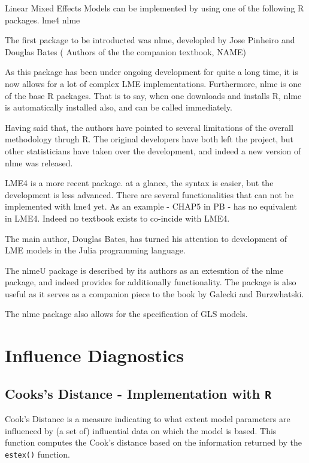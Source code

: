 	Linear Mixed Effects Models can be implemented by using one of the following R packages.
	lme4
	nlme
	
	The first package to be introducted was nlme, developled by Jose Pinheiro and Douglas Bates ( Authors of the the companion textbook, NAME)
	
	As this package has been under ongoing development for quite a long time, it is now allows for a lot of complex LME implementations. 
	Furthermore, nlme is one of the base R packages.  That is to say, when one downloads and installs R, nlme is automatically installed also, and can be called immediately.
	
	Having said that, the authors have pointed to several limitations of the overall methodology thrugh R.
	The original developers have both left the project, but other statisticians have taken over the development, and indeed a new version of nlme was released.
	
	LME4 is a more recent package. at a glance, the syntax is easier, but the development is less advanced. There are several functionalities that can not be implemented with lme4 yet. 
	As an example - CHAP5 in PB - has no equivalent in LME4. Indeed no textbook exists to co-incide with LME4.
	
	The main author, Douglas Bates, has turned his attention to development of LME models in the Julia programming language.
	
	The nlmeU package is described by its authors as an extesntion of the nlme package, and indeed provides for additionally functionality. The package is also useful as it serves as a companion piece to the 
	book by Galecki and Burzwhatski.
	
	The nlme package also allows for the specification of GLS models.
	
	
\chapter{Influence Diagnostics}	
\section{Cooks's Distance - Implementation with \texttt{R}}
Cook's Distance is a measure indicating to what extent model parameters are influenced by (a set of) influential data on which the model is based. This function computes the Cook's distance based on the information returned by the \texttt{estex()} function.


